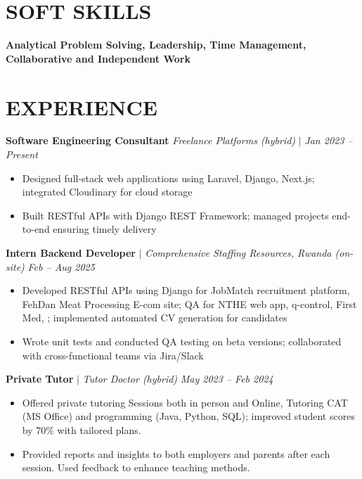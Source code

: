 \documentclass[9pt,a4paper]{article}
\begin{document}
\vspace{-2pt}

\section*{SOFT SKILLS}
\small
\textbf{Analytical Problem Solving, Leadership, Time Management, Collaborative and Independent Work}

\vspace{-2pt}

\section*{EXPERIENCE}

\small
\textbf{Software Engineering Consultant} \textit{Freelance Platforms (hybrid)} \hfill $|$ \textit{Jan 2023 -- Present}
\begin{itemize}[leftmargin=11pt]
    \item Designed full-stack web applications using Laravel, Django, Next.js; integrated Cloudinary for cloud storage
    \item Built RESTful APIs with Django REST Framework; managed projects end-to-end ensuring timely delivery
\end{itemize}

\vspace{1pt}

\textbf{Intern Backend Developer} $|$ \textit{Comprehensive Staffing Resources, Rwanda (on-site)} \hfill \textit{Feb -- Aug 2025}
\begin{itemize}[leftmargin=11pt]
    \item Developed RESTful APIs using Django for JobMatch recruitment platform, FehDan Meat Processing E-com site; QA for NTHE web app, q-control, First Med, ; implemented automated CV generation for candidates
    \item Wrote unit tests and conducted QA testing on beta versions; collaborated with cross-functional teams via Jira/Slack
\end{itemize}

\vspace{1pt}

\textbf{Private Tutor} $|$ \textit{Tutor Doctor (hybrid)} \hfill \textit{May 2023 -- Feb 2024}
\begin{itemize}[leftmargin=11pt]
    \item Offered private tutoring Sessions both in person and Online, Tutoring CAT (MS Office) and programming (Java, Python, SQL); improved student scores by 70\% with tailored plans. 
    \item Provided reports and insights to both employers and parents after each session. Used feedback to enhance teaching methods.
\end{itemize}
\end{document}
